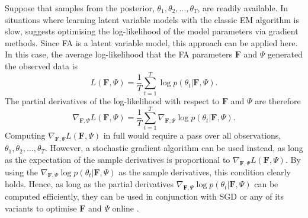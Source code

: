 \documentclass[msc,deptreport.inf]{infthesis} %
\newcommand{\matr}[1]{\mathbf{#1}}
\begin{document}
Suppose that samples from the posterior, $\theta_1, \theta_2, \dots,\theta_T$, are readily available. In situations where learning latent variable models with the classic EM algorithm is slow, \cite{barber2007} suggests optimising the log-likelihood of the model parameters via gradient methods. Since FA is a latent variable model, this approach can be applied here. In this case, the average log-likelihood that the FA parameters $\matr{F}$ and $\Psi$ generated the observed data is 
\begin{equation}
	L(\matr{F}, \Psi) = \frac{1}{T} \sum_{t=1}^T \log p(\theta_t | \matr{F}, \Psi).
\end{equation}
The partial derivatives of the log-likelihood with respect to $\matr{F}$ and $\Psi$ are therefore
\begin{equation}
	\nabla_{\matr{F}, \Psi} L(\matr{F}, \Psi) = \frac{1}{T} \sum_{t=1}^T \nabla_{\matr{F}, \Psi} \log p(\theta_t | \matr{F}, \Psi).
\end{equation}
Computing $\nabla_{\matr{F}, \Psi} L(\matr{F}, \Psi)$ in full would require a pass over all observations, $\theta_1, \theta_2, \dots, \theta_T$. However, a stochastic gradient algorithm can be used instead, as long as the expectation of the sample derivatives is proportional to $\nabla_{\matr{F}, \Psi} L(\matr{F}, \Psi)$. By using the $\nabla_{\matr{F}, \Psi} \log p(\theta_t | \matr{F}, \Psi)$ as the sample derivatives, this condition clearly holds. Hence, as long as the partial derivatives $\nabla_{\matr{F}, \Psi} \log p(\theta_t | \matr{F}, \Psi)$ can be computed efficiently, they can be used in conjunction with SGD or any of its variants to optimise $\matr{F}$ and $\Psi$ online \cite{brownlie2021}. 
\end{document}

